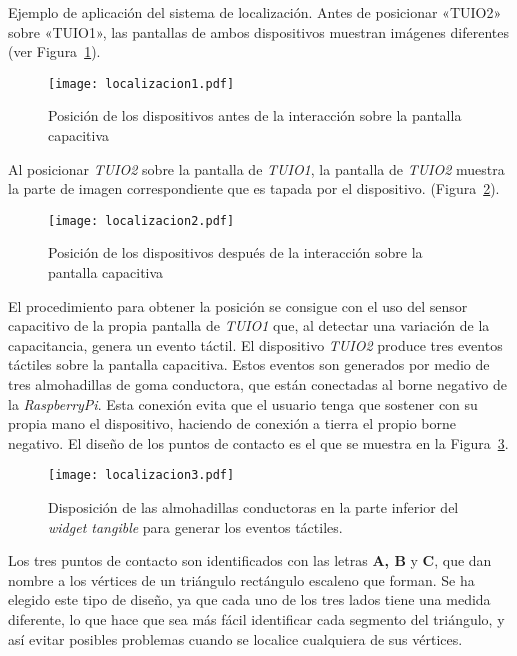 Ejemplo de aplicación del sistema de localización. Antes de posicionar «TUIO2» sobre «TUIO1», las pantallas de ambos dispositivos muestran imágenes diferentes (ver Figura~\ref{fig:Localizacion1}).
\begin{figure}[!h]
\begin{center}
\texttt{[image: localizacion1.pdf]}
\caption{Posición de los dispositivos antes de la interacción sobre la pantalla capacitiva}
\label{fig:Localizacion1}
\end{center}
\end{figure}
Al posicionar \emph{TUIO2} sobre la pantalla de \emph{TUIO1}, la pantalla de \emph{TUIO2} muestra la parte de imagen correspondiente que es tapada por el dispositivo. (Figura~\ref{fig:Localizacion2}).
\begin{figure}[!h]
\begin{center}
\texttt{[image: localizacion2.pdf]}
\caption{Posición de los dispositivos después de la interacción sobre la pantalla capacitiva}
\label{fig:Localizacion2}
\end{center}
\end{figure}

El procedimiento para obtener la posición se consigue con el uso del sensor capacitivo de la propia pantalla de \emph{TUIO1} que, al detectar una variación de la capacitancia, genera un evento táctil.
El dispositivo \emph{TUIO2} produce tres eventos táctiles sobre la pantalla capacitiva. Estos eventos son generados por medio de tres almohadillas de goma conductora, que están conectadas al borne negativo de la \emph{RaspberryPi}. Esta conexión evita que el usuario tenga que sostener con su propia mano el dispositivo, haciendo de conexión a tierra el propio borne negativo.
El diseño de los puntos de contacto es el que se muestra en la Figura~\ref{fig:Localizacion3}.
\begin{figure}[!h]
\begin{center}
\texttt{[image: localizacion3.pdf]}
\caption{Disposición de las almohadillas conductoras en la parte inferior del \emph{widget tangible} para generar los eventos táctiles. }
\label{fig:Localizacion3}
\end{center}
\end{figure}
Los tres puntos de contacto son identificados con las letras \textbf{A, B} y \textbf{C}, que dan nombre a los vértices de un triángulo rectángulo escaleno que forman. Se ha elegido este tipo de diseño, ya que cada uno de los tres lados tiene una medida diferente, lo que hace que sea más fácil identificar cada segmento del triángulo, y así evitar posibles problemas cuando se localice cualquiera de sus vértices.

